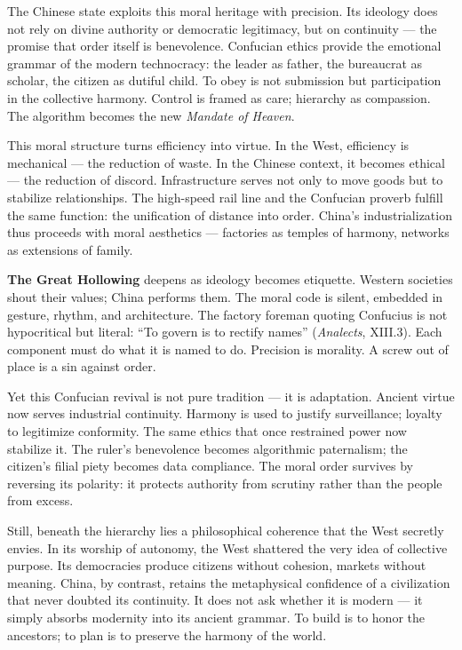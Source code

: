\documentclass[11pt,twoside]{book}
\begin{document}
The Chinese state exploits this moral heritage with precision.  
Its ideology does not rely on divine authority or democratic legitimacy, but on continuity — the promise that order itself is benevolence.  
Confucian ethics provide the emotional grammar of the modern technocracy: the leader as father, the bureaucrat as scholar, the citizen as dutiful child.  
To obey is not submission but participation in the collective harmony.  
Control is framed as care; hierarchy as compassion.  
The algorithm becomes the new \textit{Mandate of Heaven}.

This moral structure turns efficiency into virtue.  
In the West, efficiency is mechanical — the reduction of waste.  
In the Chinese context, it becomes ethical — the reduction of discord.  
Infrastructure serves not only to move goods but to stabilize relationships.  
The high-speed rail line and the Confucian proverb fulfill the same function: the unification of distance into order.  
China’s industrialization thus proceeds with moral aesthetics — factories as temples of harmony, networks as extensions of family.

\textbf{The Great Hollowing} deepens as ideology becomes etiquette.  
Western societies shout their values; China performs them.  
The moral code is silent, embedded in gesture, rhythm, and architecture.  
The factory foreman quoting Confucius is not hypocritical but literal:  
“To govern is to rectify names” (\textit{Analects}, XIII.3).  
Each component must do what it is named to do.  
Precision is morality.  
A screw out of place is a sin against order.

Yet this Confucian revival is not pure tradition — it is adaptation.  
Ancient virtue now serves industrial continuity.  
Harmony is used to justify surveillance; loyalty to legitimize conformity.  
The same ethics that once restrained power now stabilize it.  
The ruler’s benevolence becomes algorithmic paternalism; the citizen’s filial piety becomes data compliance.  
The moral order survives by reversing its polarity: it protects authority from scrutiny rather than the people from excess.

Still, beneath the hierarchy lies a philosophical coherence that the West secretly envies.  
In its worship of autonomy, the West shattered the very idea of collective purpose.  
Its democracies produce citizens without cohesion, markets without meaning.  
China, by contrast, retains the metaphysical confidence of a civilization that never doubted its continuity.  
It does not ask whether it is modern — it simply absorbs modernity into its ancient grammar.  
To build is to honor the ancestors; to plan is to preserve the harmony of the world.
\end{document}
